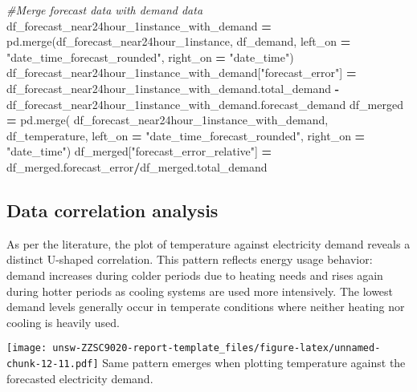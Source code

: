 \documentclass[mstat,12pt,a4paper]{unswthesis}
\newenvironment{Shaded}{\begin{snugshade}}{\end{snugshade}}
\newcommand{\CommentTok}[1]{\textcolor[rgb]{0.56,0.35,0.01}{\textit{#1}}}
\newcommand{\NormalTok}[1]{#1}
\newcommand{\OperatorTok}[1]{\textcolor[rgb]{0.81,0.36,0.00}{\textbf{#1}}}
\newcommand{\StringTok}[1]{\textcolor[rgb]{0.31,0.60,0.02}{#1}}
\begin{document}
\begin{Shaded}
\begin{Highlighting}[]
\CommentTok{\#Merge forecast data with demand data}
\NormalTok{df\_forecast\_near24hour\_1instance\_with\_demand }\OperatorTok{=}\NormalTok{ pd.merge(df\_forecast\_near24hour\_1instance, df\_demand, left\_on }\OperatorTok{=} \StringTok{"date\_time\_forecast\_rounded"}\NormalTok{, right\_on }\OperatorTok{=} \StringTok{"date\_time"}\NormalTok{)}
\NormalTok{df\_forecast\_near24hour\_1instance\_with\_demand[}\StringTok{"forecast\_error"}\NormalTok{] }\OperatorTok{=}\NormalTok{ df\_forecast\_near24hour\_1instance\_with\_demand.total\_demand }\OperatorTok{{-}}\NormalTok{ df\_forecast\_near24hour\_1instance\_with\_demand.forecast\_demand}
\NormalTok{df\_merged }\OperatorTok{=}\NormalTok{ pd.merge(}
\NormalTok{      df\_forecast\_near24hour\_1instance\_with\_demand, df\_temperature, }
\NormalTok{      left\_on }\OperatorTok{=} \StringTok{"date\_time\_forecast\_rounded"}\NormalTok{, }
\NormalTok{      right\_on }\OperatorTok{=} \StringTok{"date\_time"}\NormalTok{)}
\NormalTok{df\_merged[}\StringTok{"forecast\_error\_relative"}\NormalTok{] }\OperatorTok{=}\NormalTok{ df\_merged.forecast\_error}\OperatorTok{/}\NormalTok{df\_merged.total\_demand}
\end{Highlighting}
\end{Shaded}

\subsection{Data correlation analysis}\label{data-correlation-analysis}

As per the literature, the plot of temperature against electricity
demand reveals a distinct U-shaped correlation. This pattern reflects
energy usage behavior: demand increases during colder periods due to
heating needs and rises again during hotter periods as cooling systems
are used more intensively. The lowest demand levels generally occur in
temperate conditions where neither heating nor cooling is heavily used.

\texttt{[image: unsw-ZZSC9020-report-template\_files/figure-latex/unnamed-chunk-12-11.pdf]}
\noindent Same pattern emerges when plotting temperature against the
forecasted electricity demand.
\end{document}
